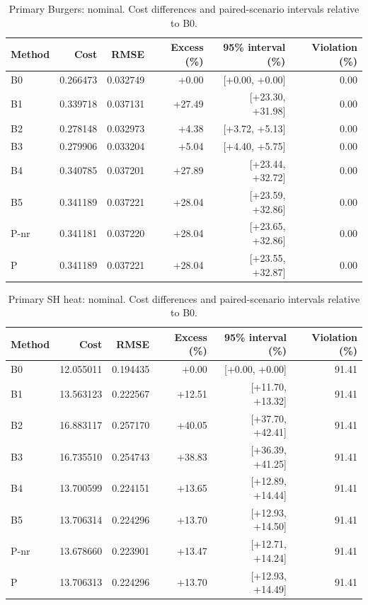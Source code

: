 \begin{table}[ht]
\centering\small
\caption{Primary Burgers: nominal. Cost differences and paired-scenario intervals relative to B0.}
\begin{tabular}{@{}lrrrrr@{}}\toprule
Method & Cost & RMSE & Excess (\%) & 95\% interval (\%) & Violation (\%)\\\midrule
B0 & 0.266473 & 0.032749 & +0.00 & [+0.00, +0.00] & 0.00\\
B1 & 0.339718 & 0.037131 & +27.49 & [+23.30, +31.98] & 0.00\\
B2 & 0.278148 & 0.032973 & +4.38 & [+3.72, +5.13] & 0.00\\
B3 & 0.279906 & 0.033204 & +5.04 & [+4.40, +5.75] & 0.00\\
B4 & 0.340785 & 0.037201 & +27.89 & [+23.44, +32.72] & 0.00\\
B5 & 0.341189 & 0.037221 & +28.04 & [+23.59, +32.86] & 0.00\\
P-nr & 0.341181 & 0.037220 & +28.04 & [+23.65, +32.86] & 0.00\\
P & 0.341189 & 0.037221 & +28.04 & [+23.55, +32.87] & 0.00\\
\bottomrule\end{tabular}
\end{table}
\begin{table}[ht]
\centering\small
\caption{Primary SH heat: nominal. Cost differences and paired-scenario intervals relative to B0.}
\begin{tabular}{@{}lrrrrr@{}}\toprule
Method & Cost & RMSE & Excess (\%) & 95\% interval (\%) & Violation (\%)\\\midrule
B0 & 12.055011 & 0.194435 & +0.00 & [+0.00, +0.00] & 91.41\\
B1 & 13.563123 & 0.222567 & +12.51 & [+11.70, +13.32] & 91.41\\
B2 & 16.883117 & 0.257170 & +40.05 & [+37.70, +42.41] & 91.41\\
B3 & 16.735510 & 0.254743 & +38.83 & [+36.39, +41.25] & 91.41\\
B4 & 13.700599 & 0.224151 & +13.65 & [+12.89, +14.44] & 91.41\\
B5 & 13.706314 & 0.224296 & +13.70 & [+12.93, +14.50] & 91.41\\
P-nr & 13.678660 & 0.223901 & +13.47 & [+12.71, +14.24] & 91.41\\
P & 13.706313 & 0.224296 & +13.70 & [+12.93, +14.49] & 91.41\\
\bottomrule\end{tabular}
\end{table}
